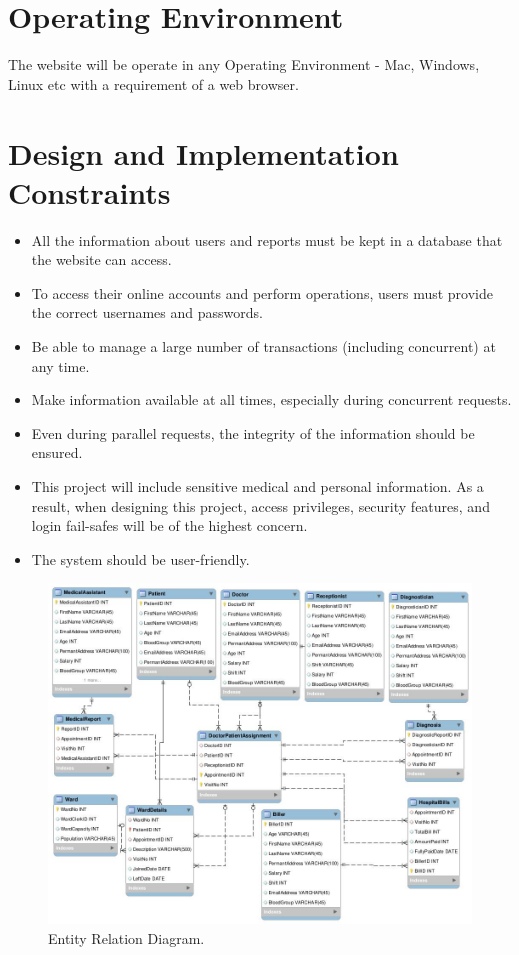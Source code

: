 \documentclass{scrreprt}
\begin{document}
\section{Operating Environment}
The website will be operate in any Operating Environment - Mac, Windows, Linux etc with a requirement of a web browser. 

\section{Design and Implementation Constraints}

\begin{itemize}
    \item All the information about users and reports must be kept in a database that the website can access.
    \item To access their online accounts and perform operations, users must provide the correct usernames and passwords.
    \item Be able to manage a large number of transactions (including concurrent) at any time.
    \item Make information available at all times, especially during concurrent requests.
    \item Even during parallel requests, the integrity of the information should be ensured.
    \item This project will include sensitive medical and personal information. As a result, when designing this project, access privileges, security features, and login fail-safes will be of the highest concern.
    \item The system should be user-friendly.
\newpage
\end{itemize}
\begin{figure}
    \centering
    \includegraphics[width=14cm]{er.jpeg}
    \caption{Entity Relation Diagram.}
    \label{fig:Entity Relation Diagram}
\end{figure}
\end{document}
